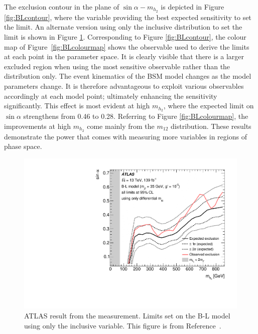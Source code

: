 The exclusion contour in the plane of $\sin\alpha-m_{h_2}$ is depicted in Figure \ref{fig:BLcontour}, where the variable providing the best expected sensitivity to set the limit. An alternate version using only the inclusive \mFourL distribution to set the limit is shown in Figure \ref{fig:BLcontourm4l}. Corresponding to Figure \ref{fig:BLcontour}, the colour map of Figure~\ref{fig:BLcolourmap} shows the observable used to derive the limits at each point in the parameter space. It is clearly visible that there is a larger excluded region when using the most sensitive observable rather than the \mFourL distribution only. The event kinematics of the BSM model changes as the model parameters change. It is therefore advantageous to exploit various observables accordingly at each model point; ultimately enhancing the sensitivity significantly. This effect is most evident at high $m_{h_2}$, where the expected limit on $\sin\alpha$ strengthens from 0.46 to 0.28. Referring to Figure \ref{fig:BLcolourmap}, the improvements at high $m_{h_2}$ come mainly from the $m_{12}$ distribution. These results demonstrate the power that comes with measuring more variables in regions of phase space. 
\begin{figure}
    \centering
    \includegraphics[width=\mediumfigwidth]{Figures/m4l/Interpretations/UpperLimitBandWithContour_2D_withTheoExcl_m4l.pdf}
    \caption{ATLAS result from the \mFourL{} measurement. Limits set on the B-L model using only the inclusive \mFourL{} variable. This figure is from Reference~\cite{m4l2021_paper}.}
    \label{fig:BLcontourm4l}
\end{figure}
